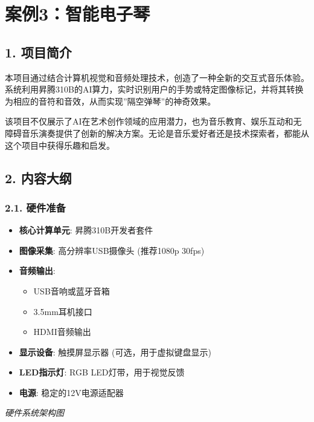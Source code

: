 \chapter{案例3：智能电子琴}\label{ux6848ux4f8b3ux667aux80fdux7535ux5b50ux7434}

\section{1. 项目简介}\label{ux9879ux76eeux7b80ux4ecb}

本项目通过结合计算机视觉和音频处理技术，创造了一种全新的交互式音乐体验。系统利用昇腾310B的AI算力，实时识别用户的手势或特定图像标记，并将其转换为相应的音符和音效，从而实现''隔空弹琴''的神奇效果。

该项目不仅展示了AI在艺术创作领域的应用潜力，也为音乐教育、娱乐互动和无障碍音乐演奏提供了创新的解决方案。无论是音乐爱好者还是技术探索者，都能从这个项目中获得乐趣和启发。

\section{2. 内容大纲}\label{ux5185ux5bb9ux5927ux7eb2}

\subsection{2.1. 硬件准备}\label{ux786cux4ef6ux51c6ux5907}

\begin{itemize}
\tightlist
\item
  \textbf{核心计算单元}: 昇腾310B开发者套件
\item
  \textbf{图像采集}: 高分辨率USB摄像头 (推荐1080p 30fps)
\item
  \textbf{音频输出}:

  \begin{itemize}
  \tightlist
  \item
    USB音响或蓝牙音箱
  \item
    3.5mm耳机接口
  \item
    HDMI音频输出
  \end{itemize}
\item
  \textbf{显示设备}: 触摸屏显示器 (可选，用于虚拟键盘显示)
\item
  \textbf{LED指示灯}: RGB LED灯带，用于视觉反馈
\item
  \textbf{电源}: 稳定的12V电源适配器
\end{itemize}

\emph{硬件系统架构图}

